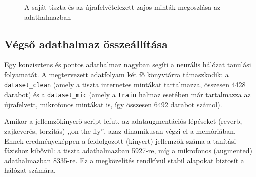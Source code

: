 \begin{figure}[H]
\centering
{}
\caption{A saját tiszta és az újrafelvételezett zajos minták megoszlása az adathalmazban}
\label{fig:mic_recorded_distribution}
\end{figure}

\subsection{Végső adathalmaz összeállítása}
\label{subsec:final_dataset}



Egy konzisztens és pontos adathalmaz nagyban segíti a neurális hálózat tanulási folyamatát. A megtervezett adatfolyam két fő könyvtárra támaszkodik: a \texttt{dataset\_clean} (amely a tiszta internetes mintákat tartalmazza, összesen 4428 darabot) és a \texttt{dataset\_mic} (amely a \texttt{train} halmaz esetében már tartalmazza az újrafelvett, mikrofonos mintákat is, így összesen 6492 darabot számol).

Amikor a jellemzőkinyerő script lefut, az adataugmentációs lépéseket (reverb, zajkeverés, torzítás) ,,on-the-fly'', azaz dinamikusan végzi el a memóriában. Ennek eredményeképpen a feldolgozott (kinyert) jellemzők száma a tanítási fázishoz kibővül: a tiszta adathalmazban 5927-re, míg a mikrofonos (augmented) adathalmazban 8335-re. Ez a megközelítés rendkívül stabil alapokat biztosít a hálózat számára.

